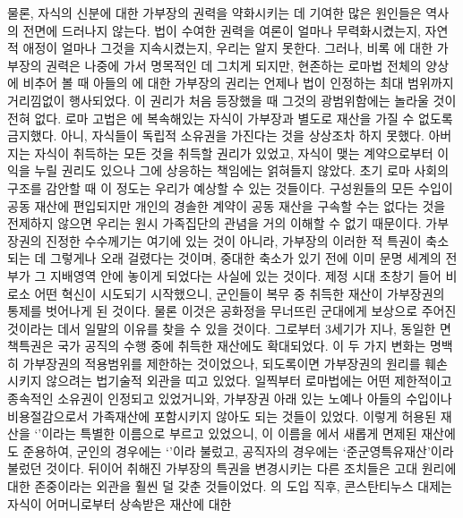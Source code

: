 물론,
자식의 신분에 대한 가부장의 권력을 약화시키는 데 기여한 많은 원인들은
역사의 전면에 드러나지 않는다.
법이 수여한 권력을 여론이 얼마나 무력화시켰는지,
자연적 애정이 얼마나 그것을 지속시켰는지,
우리는 알지 못한다.
그러나, 비록 에 대한 가부장의 권력은 나중에 가서
명목적인 데 그치게 되지만,
현존하는 로마법 전체의 양상에 비추어 볼 때
아들의 에 대한 가부장의 권리는 언제나
법이 인정하는 최대 범위까지 거리낌없이 행사되었다.
이 권리가 처음 등장했을 때 그것의 광범위함에는 놀라울 것이 전혀 없다.
로마 고법은 에 복속해있는 자식이 가부장과 별도로 재산을
가질 수 없도록 금지했다. 아니, 
자식들이 독립적 소유권을 가진다는 것을 상상조차 하지 못했다.
아버지는 자식이 취득하는 모든 것을 취득할 권리가 있었고,
자식이 맺는 계약으로부터 이익을 누릴 권리도 있으나
그에 상응하는 책임에는 얽혀들지 않았다.
초기 로마 사회의 구조를 감안할 때
이 정도는 우리가 예상할 수 있는 것들이다.
구성원들의 모든 수입이 공동 재산에 편입되지만
개인의 경솔한 계약이 공동 재산을 구속할 수는 없다는 것을
전제하지 않으면 우리는 원시 가족집단의 관념을 거의 이해할 수 없기 때문이다.
가부장권의 진정한 수수께기는 여기에 있는 것이 아니라,
가부장의 이러한 적 특권이 축소되는 데 그렇게나 오래 걸렸다는 것이며,
중대한 축소가 있기 전에 이미 문명 세계의 전부가 그 지배영역 안에
놓이게 되었다는 사실에 있는 것이다.
제정 시대 초창기 들어 비로소 어떤 혁신이 시도되기 시작했으니,
군인들이 복무 중 취득한 재산이 가부장권의 통제를 벗어나게 된 것이다.
물론 이것은 공화정을 무너뜨린 군대에게 보상으로 주어진 것이라는 데서
일말의 이유를 찾을 수 있을 것이다.
그로부터 3세기가 지나, 동일한 면책특권은 국가 공직의 수행 중에 취득한 재산에도
확대되었다.
이 두 가지 변화는 명백히 가부장권의 적용범위를 제한하는 것이었으나,
되도록이면 가부장권의 원리를 훼손시키지 않으려는 법기술적 외관을 띠고 있었다.
일찍부터 로마법에는 어떤 제한적이고 종속적인 소유권이 인정되고 있었거니와,
가부장권 아래 있는 노예나 아들의 수입이나 비용절감으로서
가족재산에 포함시키지 않아도 되는 것들이 있었다. 이렇게 허용된 재산을
`'이라는 특별한 이름으로 부르고 있었으니,
이 이름을 에서 새롭게 면제된 재산에도 준용하여,
군인의 경우에는 `'이라
불렀고, 공직자의 경우에는
`준군영특유재산'이라
불렀던 것이다.
뒤이어 취해진 가부장의 특권을 변경시키는 다른 조치들은
고대 원리에 대한 존중이라는 외관을 훨씬 덜 갖춘 것들이었다.
의 도입 직후,
콘스탄티누스 대제는 자식이 어머니로부터 상속받은 재산에 대한

